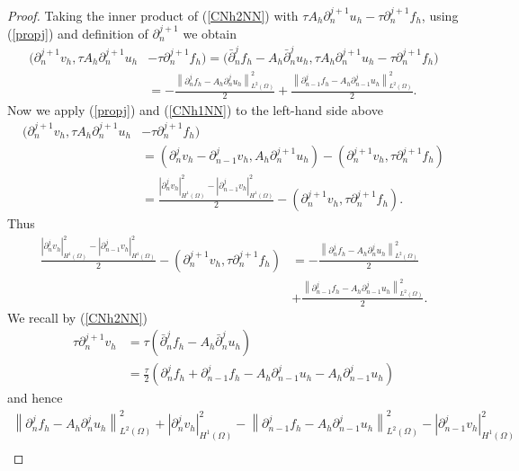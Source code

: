 \documentclass{imanum}
\begin{document}
\begin{proof}
Taking the inner product of (\ref{CNh2NN}) with $\tau A_h{\partial}^{j + 1}_n u_h-\tau {\partial}^{j + 1}_n f_h$, using (\ref{propj}) and definition of ${\partial}^{j+1}_n$  we obtain
\begin{align*}
 \biggl(\partial_n^{j+1} v_h ,
   \tau A_h{\partial}^{j + 1}_n u_h&-\tau {\partial}^{j + 1}_n f_h \biggr)=\biggl(\bar{\partial}_n^{j} f_h - A_h\bar{\partial}_n^{j} u_h, \tau A_h{\partial}^{j + 1}_n u_h-\tau {\partial}^{j + 1}_n f_h \biggr)\\
&= -\frac{\left\| \partial^{j}_n f_h-A_h\partial^{j}_n u_h  \right\|_{L^2(\Omega)}^2}{2}
   + \frac{\left\|  \partial^{j}_{n-1} f_h-A_h\partial^{j}_{n-1} u_h  \right\|_{L^2(\Omega)}^2}{2}.
\end{align*}
Now we apply (\ref{propj}) and (\ref{CNh1NN}) to the left-hand side above 
\begin{align*}
 \biggl(\partial_n^{j+1} v_h ,
   \tau A_h{\partial}^{j + 1}_n u_h&-\tau {\partial}^{j + 1}_n f_h \biggr)
   \\
    &=\left({\partial_n^{j } v_h - \partial_{n-1}^{j} v_h} , A_h{\partial}^{j + 1}_n u_h\right) 
   -\left(\partial_n^{j+1 } v_h , \tau{\partial}^{j + 1}_n f_h\right)\\
   &=  \frac{\left| {\partial}^j_n v_h \right|^2_{H^1(\Omega)} - \left| {\partial}^j_{n - 1}
   v_h \right|_{H^1(\Omega)}^2}{2}
   -\left(\partial_n^{j+1 } v_h , \tau{\partial}^{j + 1}_n f_h\right).
\end{align*}
Thus \begin{align*}
  \frac{\left| {\partial}^j_n v_h \right|^2_{H^1(\Omega)} - \left| {\partial}^j_{n - 1}
   v_h \right|_{H^1(\Omega)}^2}{2}
   -\left(\partial_n^{j+1 } v_h , \tau{\partial}^{j + 1}_n f_h\right)&= -\frac{\left\| \partial^{j}_n f_h-A_h\partial^{j}_n u_h  \right\|_{L^2(\Omega)}^2}{2}\\
   &+ \frac{\left\|  \partial^{j}_{n-1} f_h-A_h\partial^{j}_{n-1} u_h  \right\|_{L^2(\Omega)}^2}{2}.
\end{align*}
We recall by (\ref{CNh2NN}) 
\begin{align*}
\tau{\partial}^{j+1}_{n}v_h&=\tau\left( \bar{\partial}^{j}_{n}f_h-A_h\bar{\partial}^{j}_{n} u_h \right)\\
&= \frac{\tau}{2}\left({\partial}^{j}_{n}f_h+{\partial}^{j}_{n-1}f_h-A_h{\partial}^{j}_{n-1} u_h - A_h{\partial}^{j}_{n-1} u_h \right)
\end{align*}
and hence 
\begin{align*}
\left\| \partial^{j}_nf_h-A_h\partial^{j}_n u_h \right\|_{L^2(\Omega)}^2 + \left| {\partial}^j_{n} v_h \right|_{H^1(\Omega)}^2-\left\| \partial^{j}_{n-1}f_h-A_h\partial^{j}_{n-1} u_h \right\|_{L^2(\Omega)}^2 - \left| {\partial}^j_{n-1} v_h \right|_{H^1(\Omega)}^2 \\

\end{align*}
\end{proof}
\end{document}
